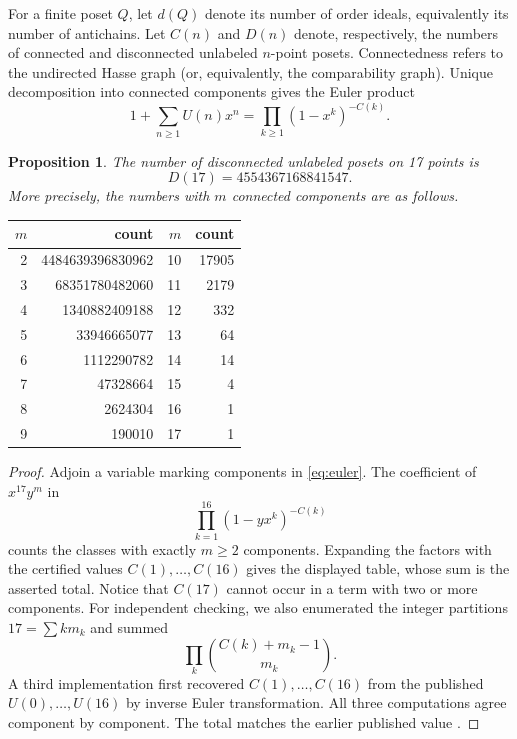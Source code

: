 \documentclass[11pt]{amsart}
\newtheorem{proposition}[theorem]{Proposition}
\theoremstyle{definition}
\begin{document}
For a finite poset $Q$, let $d(Q)$ denote its number of order ideals,
equivalently its number of antichains.  Let $C(n)$ and $D(n)$ denote,
respectively, the numbers of connected and disconnected unlabeled
$n$-point posets.  Connectedness refers to the undirected Hasse graph (or,
equivalently, the comparability graph).  Unique decomposition into connected
components gives the Euler product
\begin{equation}\label{eq:euler}
1+\sum_{n\geq1}U(n)x^n=\prod_{k\geq1}(1-x^k)^{-C(k)}.
\end{equation}

\begin{proposition}\label{prop:disconnected}
The number of disconnected unlabeled posets on 17 points is
\[
D(17)=4554367168841547.
\]
More precisely, the numbers with $m$ connected components are as follows.
\end{proposition}

\begin{center}
\begin{tabular}{r@{\quad}r@{\qquad}r@{\quad}r}
\toprule
$m$ & count & $m$ & count\\
\midrule
2 & 4484639396830962 & 10 & 17905\\
3 & 68351780482060 & 11 & 2179\\
4 & 1340882409188 & 12 & 332\\
5 & 33946665077 & 13 & 64\\
6 & 1112290782 & 14 & 14\\
7 & 47328664 & 15 & 4\\
8 & 2624304 & 16 & 1\\
9 & 190010 & 17 & 1\\
\bottomrule
\end{tabular}
\end{center}

\begin{proof}
Adjoin a variable marking components in \eqref{eq:euler}.  The coefficient
of $x^{17}y^m$ in
\[
\prod_{k=1}^{16}(1-yx^k)^{-C(k)}
\]
counts the classes with exactly $m\geq2$ components.  Expanding the factors
with the certified values $C(1),\ldots,C(16)$ gives the displayed table, whose
sum is the asserted total.  Notice that $C(17)$ cannot occur in a term with
two or more components.  For independent checking, we also enumerated the
integer partitions $17=\sum k m_k$ and summed
\[
\prod_k \binom{C(k)+m_k-1}{m_k}.
\]
A third implementation first recovered $C(1),\ldots,C(16)$ from the published
$U(0),\ldots,U(16)$ by inverse Euler transformation.  All three computations
agree component by component.  The total matches the earlier published value
\cite[Table~4]{MohammadNoorTalukder2022}.
\end{proof}
\end{document}
